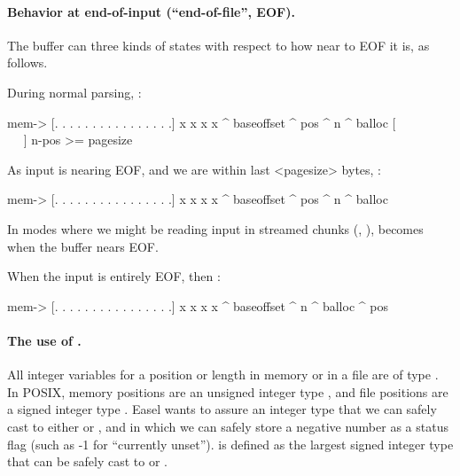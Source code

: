 \paragraph{Behavior at end-of-input (``end-of-file'', EOF).}

The buffer can three kinds of states with respect to how near to EOF
it is, as follows.

During normal parsing, :

\begin{cchunk}
  mem->  {[. . . . . . . . . . . . . . . .] x x x x}
           ^ baseoffset    ^ pos            ^ n   ^ balloc
                          [~ ~ ~ ~ ~ ~ ~ ~]
                          n-pos >= pagesize
\end{cchunk}

As input is nearing EOF, and we are within last <pagesize> bytes,
:

\begin{cchunk}
 mem->  {[. . . . . . . . . . . . . . . .] x x x x}
          ^ baseoffset              ^ pos  ^ n   ^ balloc
\end{cchunk}

In modes where we might be reading input in streamed chunks
(, 
),  becomes 
when the buffer nears EOF.

When the input is entirely EOF, then :

\begin{cchunk}
  mem->  {[. . . . . . . . . . . . . . . .] x x x x}
           ^ baseoffset                     ^ n   ^ balloc
                                            ^ pos
\end{cchunk}





\paragraph{ The use of . }

All integer variables for a position or length in memory or in a file
are of type . In POSIX, memory positions are an
unsigned integer type , and file positions are a signed
integer type . Easel wants to assure an integer type
that we can safely cast to either  or ,
and in which we can safely store a negative number as a status flag
(such as -1 for ``currently unset'').  is defined
as the largest signed integer type that can be safely cast to
 or .
